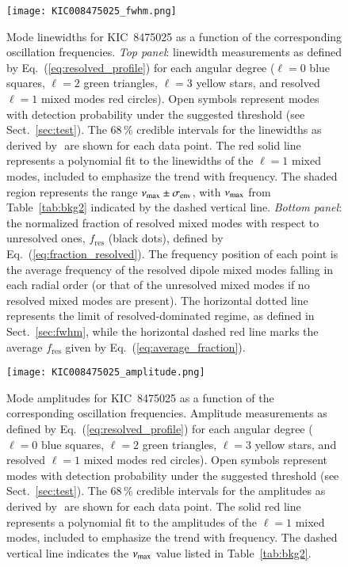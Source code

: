 \begin{figure}
   \centering
   \texttt{[image: KIC008475025\_fwhm.png]}
      \caption{Mode linewidths for KIC~8475025 as a function of the corresponding oscillation frequencies. \textit{Top panel}: linewidth measurements as defined by Eq.~(\ref{eq:resolved_profile}) for each angular degree ($\ell = 0$ blue squares, $\ell = 2$ green triangles, $\ell = 3$ yellow stars, and resolved $\ell = 1$ mixed modes red circles). Open symbols represent modes with detection probability under the suggested threshold (see Sect.~\ref{sec:test}). The 68\,\% credible intervals for the linewidths as derived by \diamonds\,\,are shown for each data point. The red solid line represents a polynomial fit to the linewidths of the $\ell = 1$ mixed modes, included to emphasize the trend with frequency. The shaded region represents the range $\nu_\mathrm{max} \pm \sigma_\mathrm{env}$, with $\nu_\mathrm{max}$ from Table~\ref{tab:bkg2} indicated by the dashed vertical line. \textit{Bottom panel}: the normalized fraction of resolved mixed modes with respect to unresolved ones, $f_\mathrm{res}$ (black dots), defined by Eq.~(\ref{eq:fraction_resolved}). The frequency position of each point is the average frequency of the resolved dipole mixed modes falling in each radial order (or that of the unresolved mixed modes if no resolved mixed modes are present). The horizontal dotted line represents the limit of resolved-dominated regime, as defined in Sect.~\ref{sec:fwhm}, while the horizontal dashed red line marks the average $f_\mathrm{res}$ given by Eq.~(\ref{eq:average_fraction}).}
    \label{fig:8475025fwhm}
\end{figure}

\begin{figure}
   \centering
   \texttt{[image: KIC008475025\_amplitude.png]}
      \caption{Mode amplitudes for KIC~8475025 as a function of the corresponding oscillation frequencies. Amplitude measurements as defined by Eq.~(\ref{eq:resolved_profile}) for each angular degree ($\ell = 0$ blue squares, $\ell = 2$ green triangles, $\ell = 3$ yellow stars, and resolved $\ell = 1$ mixed modes red circles). Open symbols represent modes with detection probability under the suggested threshold (see Sect.~\ref{sec:test}). The 68\,\% credible intervals for the amplitudes as derived by \diamonds\,\,are shown for each data point. The solid red line represents a polynomial fit to the amplitudes of the $\ell = 1$ mixed modes, included to emphasize the trend with frequency. The dashed vertical line indicates the $\nu_\mathrm{max}$ value listed in Table~\ref{tab:bkg2}.}
    \label{fig:8475025amplitude}
\end{figure}
\clearpage

